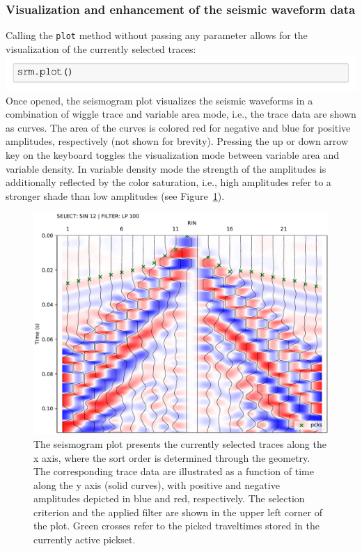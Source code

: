 \documentclass[a4paper,fleqn]{cas-sc}
\begin{document}
\subsubsection{Visualization and enhancement of the seismic waveform data}
Calling the \texttt{plot} method without passing any parameter allows for the visualization of the currently selected traces:
\newline
\includegraphics[width=.5\textwidth]{./figures/plot.pdf}
\newline
Once opened, the seismogram plot visualizes the seismic waveforms in a combination of wiggle trace and variable area mode, i.e., the trace data are shown as curves. The area of the curves is colored red for negative and blue for positive amplitudes, respectively (not shown for brevity). Pressing the up or down arrow key on the keyboard toggles the visualization mode between variable area and variable density. In variable density mode the strength of the amplitudes is additionally reflected by the color saturation, i.e., high amplitudes refer to a stronger shade than low amplitudes (see Figure~\ref{fig:srm_intro}).
\begin{figure}
	\centering
	\includegraphics[width=.75\textwidth]{figures/pickwindow_intro.pdf}
	\caption{The seismogram plot presents the currently selected traces along the x axis, where the sort order is determined through the geometry. The corresponding trace data are illustrated as a function of time along the y axis (solid curves), with positive and negative amplitudes depicted in blue and red, respectively. The selection criterion and the applied filter are shown in the upper left corner of the plot. Green crosses refer to the picked traveltimes stored in the currently active pickset.}
	\label{fig:srm_intro}
\end{figure}
\end{document}
